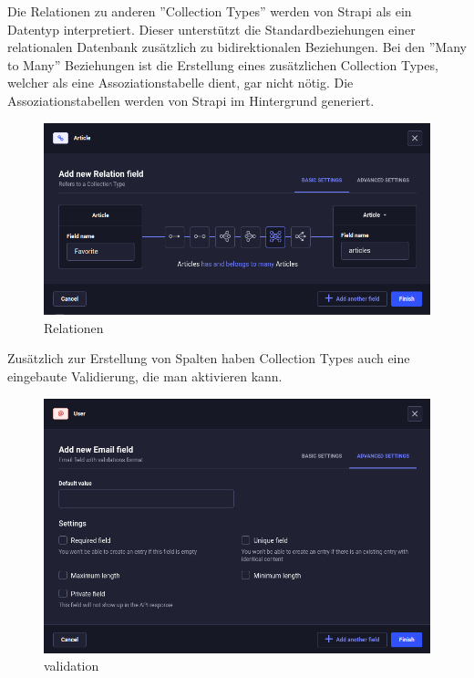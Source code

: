 Die Relationen zu anderen ''Collection Types'' werden von Strapi als ein Datentyp interpretiert.
Dieser unterstützt die Standardbeziehungen einer relationalen Datenbank zusätzlich zu bidirektionalen Beziehungen.
Bei den ''Many to Many'' Beziehungen ist die Erstellung eines zusätzlichen Collection Types, welcher als eine Assoziationstabelle dient, gar nicht nötig.
Die Assoziationstabellen werden von Strapi im Hintergrund generiert.

\begin{figure}[H]
  \centering
  \includegraphics[width=\textwidth]{./pics/relations}
  \caption{Relationen}
  \label{relations}
\end{figure}

Zusätzlich zur Erstellung von Spalten haben Collection Types auch eine eingebaute Validierung, die man aktivieren kann.

\begin{figure}[H]

  \centering
  \includegraphics[width=\textwidth]{./pics/validation.png}
  \caption{validation}
  \label{validation}

\end{figure}

